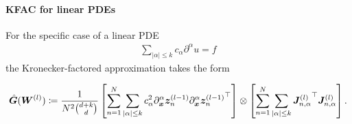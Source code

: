 \paragraph{KFAC for linear PDEs}

For the specific case of a linear PDE
\begin{align}
    \sum_{\lvert \alpha \rvert\le k} c_\alpha \partial^\alpha u = f
\end{align}
the Kronecker-factored approximation takes the form
\begin{tcolorbox}[colframe=kfac, title={KFAC for ENGD for a general linear PDE},bottom=0mm,top=0mm,middle=0mm]
\begin{align*}\label{eq:KFAC-PINNs-general}
    \hat{\mG}%
    (\mW^{(l)})
    \coloneqq \frac{1}{N^2\binom{d+k}{d} }
    \left[\sum_{n=1}^N \sum_{\lvert \alpha \rvert \le k} %
    c_\alpha^2\partial_\vx^\alpha \vz_n^{(l-1)} {\partial_\vx^\alpha \vz_n^{(l-1)}}^\top\right]
    \otimes
    \left[\sum_{n=1}^N\sum_{\lvert \alpha \rvert \le k} {\mJ^{(l)}_{n,\alpha}}^\top {\mJ^{(l)}_{n,\alpha}} \right].
\end{align*}
\end{tcolorbox}
